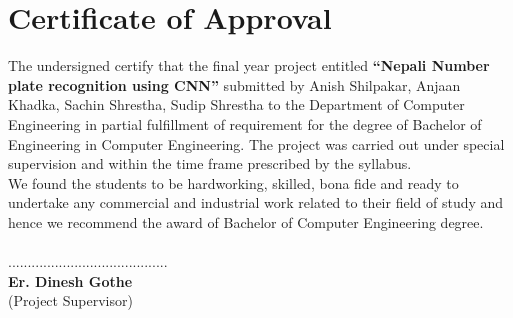
		\begingroup
			\let\clearpage\relax
			\chapter*{Certificate of Approval}
		\endgroup
		\justifying
		
	   The undersigned certify that the final year project entitled \textbf{“Nepali Number plate recognition using CNN”} submitted by Anish Shilpakar, Anjaan Khadka, Sachin Shrestha, Sudip Shrestha to the Department of Computer Engineering in partial fulfillment of requirement for
the degree of Bachelor of Engineering in Computer Engineering. The project was
carried out under special supervision and within the time frame prescribed by the
syllabus.
\\
We found the students to be hardworking, skilled, bona fide and ready to undertake any
commercial and industrial work related to their field of study and hence we recommend
the award of Bachelor of Computer Engineering degree.\\
\vspace{1.5cm}
\\
.........................................\\
\textbf{Er. Dinesh Gothe}\\
(Project Supervisor)\\

\vspace{1.5cm}

    \break
